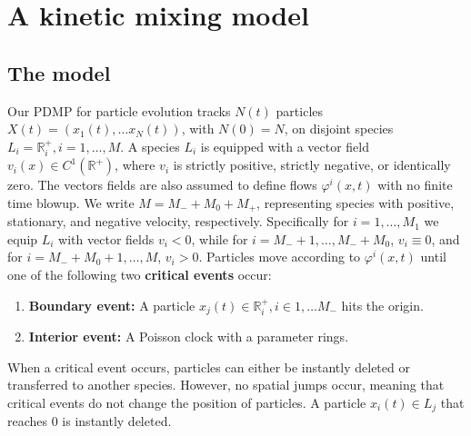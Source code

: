 \section{A kinetic mixing model}\label{themodel}
\subsection{The model}
Our PDMP for particle evolution tracks $N(t)$ particles $X(t) = (x_1(t),\dots x_N(t))$, with $N(0) = N$,  on disjoint species $L_i = \mathbb{R}^+_i, i = 1, \dots, M$.   A species $L_i$ is equipped with a vector field $v_i(x)\in C^1(\mathbb{R}^+)$, where $v_i$ is strictly positive, strictly negative, or identically zero.  The vectors fields are also assumed to define flows $\varphi^i(x,t)$ with no finite time blowup.  We write  $M = M_-+M_0+M_+$, representing species with positive, stationary, and negative velocity, respectively. Specifically for $i = 1, \dots, M_{1}$ we equip $L_i$  with vector fields  $v_i<0$, while for $i = M_-+1, \dots, M_-+M_0$, $v_i \equiv 0$, and for $i = M_-+M_0+1, \dots, M$, $v_i > 0$.   Particles move according to $\varphi^i(x,t)$ until one of the following two \textbf{critical events} occur:\begin{enumerate}
\item 
\textbf{Boundary event:} A particle $x_j(t) \in \mathbb{R}^+_i, i \in 1, \dots M_-$ hits the origin.
\item
\textbf{Interior event:} A Poisson clock with a parameter rings.
\end{enumerate} 
When a critical event occurs, particles can either be instantly deleted or transferred to another species.  However, no spatial jumps occur, meaning that critical events do not change the position of particles.  A particle $x_i(t) \in L_j$ that reaches 0 is instantly deleted.

 

 
  

